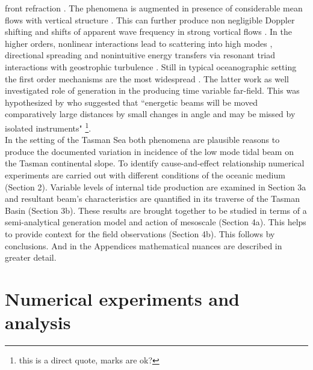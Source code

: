 \documentclass[12pt]{article}
\begin{document}
front refraction \citep{rainville2006propagation, zaron2014time, kelly2016internal}. The phenomena 
is augmented in presence of considerable mean flows with vertical structure 
\citep{park2006internal, buijsman2017eq}. This can further produce non negligible Doppler 
shifting 
\citep{chavanne2010surface} and shifts of apparent wave frequency in strong vortical flows 
\citep{kunze1985near}. In the higher orders, nonlinear interactions lead to scattering into 
high modes \citep{dunphy2014focusing}, directional spreading \citep{wagner2017asymptotic, 
dunphy2017low} and nonintuitive energy transfers via resonant triad interactions with geostrophic 
turbulence \citep{ward2010scattering}. Still in typical oceanographic setting the first order 
mechanisms are the most widespread \citep{kelly2016internal, zaron2014time}. The latter 
work as well investigated role of generation in the producing time variable far-field. This was  
 hypothesized by \citep{wunsch1975internal} who suggested that ``energetic beams will be moved 
comparatively large distances by small changes in angle and may be missed by isolated instruments" 
\footnote{this is a direct quote, marks are ok?}.\\
In the setting of the Tasman Sea both phenomena are plausible reasons to produce the documented 
variation 
in incidence of the low mode tidal beam on the Tasman continental slope. To identify 
cause-and-effect 
relationship numerical experiments are carried out with different conditions of the oceanic medium 
(Section 2). Variable levels of internal tide production are examined in Section 3a and 
resultant beam's characteristics are quantified in its traverse of the Tasman Basin (Section 3b). 
These results are brought together to be studied in terms of a semi-analytical generation 
model and action of mesoscale (Section 4a). This helps to provide context for the field 
observations (Section 4b). This follows by conclusions. And in the Appendices mathematical nuances 
are described in greater detail.

\newpage

\section{Numerical experiments and analysis}
\end{document}
